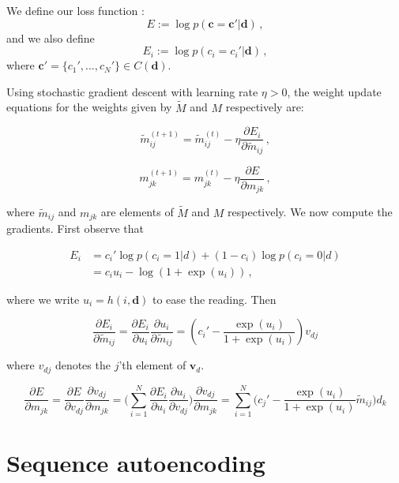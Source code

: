 \documentclass[12pt]{article}\pagestyle{myheadings}
\newcommand{\M}{\tilde{M}}
\newcommand{\tmij}{\tilde{m}_{ij}}
\newcommand{\mjk}{{m}_{jk}}
\newcommand{\boldc}{\boldsymbol c}
\newcommand{\boldd}{\boldsymbol d}
\newcommand{\boldvd}{\boldsymbol v_d}
\begin{document}
We define our loss function :
\begin{equation}
E := \log p(\boldc = \boldc'|\boldd) \,,
\end{equation}
and we also define
\begin{equation}
E_i := \log  p(c_i = c_i'|  \boldd) \,,
\end{equation} 
where $\boldc'= \{c_1',...,c_N'\} \in C(\boldd)$.

Using stochastic gradient descent with learning rate $\eta > 0$, the weight update equations for the weights given by $\M$ and $M$ respectively are:

\[
\tmij^{(t+1)} = \tmij^{(t)} - \eta \frac{\partial E_i}{\partial \tmij} \,,
\]

\[
\mjk^{(t+1)} = \mjk^{(t)} - \eta \frac{\partial E}{\partial \mjk} \,,
\]

where $\tmij$ and $\mjk$ are elements of $\M$ and $M$ respectively.
We now compute the gradients. First observe that

\[
\begin{split}
E_i &= c_i' \log p(c_i = 1 | d) + (1-c_i) \log p(c_i = 0 | d)\\
&= c_i u_i - \log(1 + \exp(u_i)) \,,
\end{split}
\]

where we write $u_i = h(i,\boldd)$ to ease the reading. Then 

\[ 
\frac{\partial E_i}{\partial \tmij} = \dfrac{\partial E_i}{\partial u_i} \dfrac{\partial u_i}{\partial \tmij} = (c_i' - \frac{\exp(u_i)}{1 + \exp(u_i)}) v_{dj}
\]

where $v_{dj}$ denotes the $j$'th element of $\boldvd$.


\[ 
\frac{\partial E}{\partial \mjk} = \dfrac{\partial E}{\partial v_{dj}} \dfrac{\partial v_{dj}}{\partial \mjk} = \big(\sum_{i=1}^N \dfrac{\partial E_i}{\partial u_i} \dfrac{\partial u_i}{\partial v_{dj}}\big) \dfrac{\partial v_{dj}}{\partial \mjk} = \sum_{i=1}^N \big( c_j' - \frac{\exp(u_i)}{1 + \exp(u_i)} \tmij \big) d_k
\]


 
 
\section{Sequence autoencoding}
\end{document}

